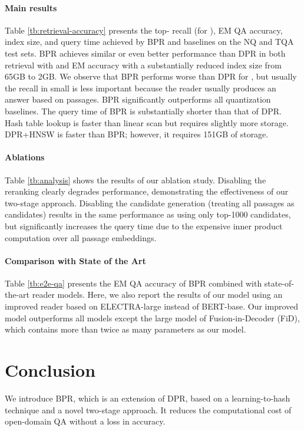 \documentclass[11pt,a4paper]{article}
\begin{document}
\paragraph{Main results}
Table \ref{tb:retrieval-accuracy} presents the top- recall (for ), EM QA accuracy, index size, and query time achieved by BPR and baselines on the NQ and TQA test sets.
BPR achieves similar or even better performance than DPR in both retrieval with  and EM accuracy with a substantially reduced index size from 65GB to 2GB.
We observe that BPR performs worse than DPR for , but usually the recall in small  is less important because the reader usually produces an answer based on  passages.
BPR significantly outperforms all quantization baselines.
The query time of BPR is substantially shorter than that of DPR.
Hash table lookup is faster than linear scan but requires slightly more storage.
DPR+HNSW is faster than BPR; however, it requires 151GB of storage.

\paragraph{Ablations}
Table \ref{tb:analysis} shows the results of our ablation study.
Disabling the reranking clearly degrades performance, demonstrating the effectiveness of our two-stage approach.
Disabling the candidate generation (treating all passages as candidates) results in the same performance as using only top-1000 candidates, but significantly increases the query time due to the expensive inner product computation over all passage embeddings.

\paragraph{Comparison with State of the Art}
\label{subsec:e2e-qa}
Table \ref{tb:e2e-qa} presents the EM QA accuracy of BPR combined with state-of-the-art reader models.
Here, we also report the results of our model using an improved reader based on ELECTRA-large \cite{Clark2020ELECTRA:Generators} instead of BERT-base.
Our improved model outperforms all models except the large model of Fusion-in-Decoder (FiD), which contains more than twice as many parameters as our model.

\section{Conclusion}
We introduce BPR, which is an extension of DPR, based on a learning-to-hash technique and a novel two-stage approach.
It reduces the computational cost of open-domain QA without a loss in accuracy.
\end{document}
